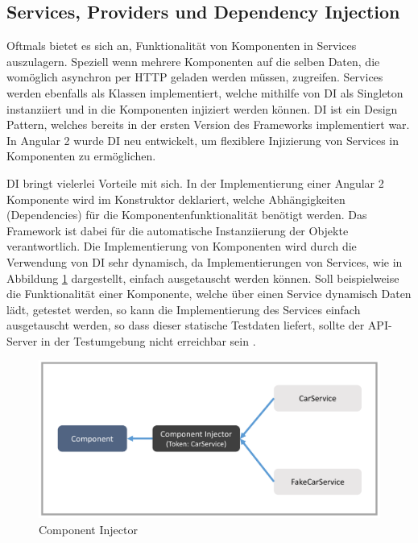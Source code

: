 \newpage



\vspace{0.3cm}




\subsection{Services, Providers und Dependency Injection}
\label{sec:services}

Oftmals bietet es sich an, Funktionalität von Komponenten in Services auszulagern.
Speziell wenn mehrere Komponenten auf die selben Daten,
die womöglich asynchron per HTTP geladen werden müssen, zugreifen.
Services werden ebenfalls als Klassen implementiert, welche mithilfe von \ac{DI}
als Singleton instanziiert und in die Komponenten injiziert werden können.
\ac{DI} ist ein Design Pattern, welches bereits in der ersten Version des Frameworks implementiert war.
In Angular 2 wurde \ac{DI} neu entwickelt, um flexiblere Injizierung von Services in Komponenten zu ermöglichen.

\ac{DI} bringt vielerlei Vorteile mit sich. In der Implementierung einer Angular 2 Komponente wird im
Konstruktor deklariert, welche Abhängigkeiten (Dependencies) für die Komponentenfunktionalität benötigt werden.
Das Framework ist dabei für die automatische Instanziierung der Objekte verantwortlich.
Die Implementierung von Komponenten wird durch die Verwendung von \ac{DI} sehr dynamisch,
da Implementierungen von Services, wie in Abbildung \ref{service-injection} dargestellt, einfach ausgetauscht werden können.
Soll beispielweise die Funktionalität einer Komponente, welche über einen Service dynamisch Daten lädt, getestet werden,
so kann die Implementierung des Services einfach ausgetauscht werden, so dass dieser statische Testdaten liefert,
sollte der API-Server in der Testumgebung nicht erreichbar sein \cite[281]{Angular2}.


\vspace{0.3cm}

\begin{figure}[ht]
 \centering
 \includegraphics[width=0.8\linewidth]{kapitel3/component-injector.png}
 \caption{Component Injector \cite[343]{Angular2}}
 \label{service-injection}
\end{figure}
\vspace{0.3cm}

